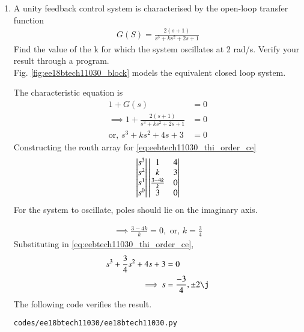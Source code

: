 \begin{enumerate}[label=\thesubsection.\arabic*.,ref=\thesubsection.\theenumi]
\item A unity feedback control system is characterised by the open-loop transfer function
\begin{align}
G(S) = \frac{2(s+1)}{s^3 + ks^2 + 2s +1}
\end{align}
Find the value of the k for which the system oscillates at 2 rad/s.  Verify your result through a program.\\
%
\solution Fig. \ref{fig:ee18btech11030_block} models the equivalent closed loop system. 


\begin{figure}[!ht]
	\begin{center}
		
		\resizebox{\columnwidth}{!}{}
	\end{center}
\caption{}
\label{fig:ee18btech11030}
\end{figure}


%
The characteristic equation is
\begin{align}
1 + G(s) &= 0
\\
\implies 1 + \frac{2(s+1)}{s^3 + ks^2 + 2s +1} &= 0
\\
\text{or, } s^3+ks^2+4s+3 &= 0 
\label{eq:eebtech11030_thi_order_ce}
\end{align}
Constructing the routh array for \eqref{eq:eebtech11030_thi_order_ce}
\begin{align}
\begin{vmatrix}s^3\\s^2\\s^1 \\ s^0\end{vmatrix}
\begin{vmatrix}1 & 4 \\ k & 3 \\  \frac{3-4k}{k} & 0\\ 3 & 0\end{vmatrix} 
\end{align}
For the system to oscillate, poles should lie on the imaginary axis. 

\begin{align}
\implies \frac{3-4k}{k} = 0, \text{ or, }  k = \frac{3}{4}
\end{align}
Substituting in \eqref{eq:eebtech11030_thi_order_ce},
\begin{align} 
s^3+\frac{3}{4}s^2+4s+3 &= 0
\\
\implies  s &= \frac{-3}{4},\pm 2\j
\end{align}
%
The following code verifies the result.
\begin{lstlisting}
codes/ee18btech11030/ee18btech11030.py
\end{lstlisting}


\end{enumerate}
